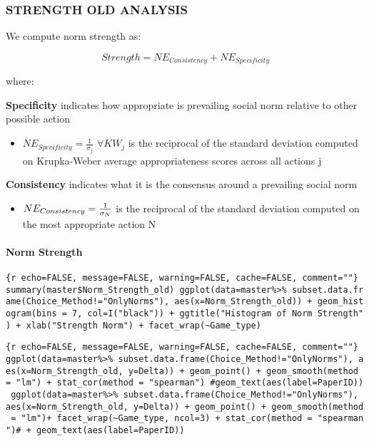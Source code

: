 \hypertarget{strength-old-analysis}{%
\subsubsection{STRENGTH OLD ANALYSIS}\label{strength-old-analysis}}

We compute norm strength as:

\[Strength = {NE_{Consistency}+NE_{Specificity}}\]

where:

\textbf{Specificity} indicates how appropriate is prevailing social norm
relative to other possible action

\begin{itemize}
\tightlist
\item
  \(NE_{Specificity} = \frac{1}{\sigma_j}\) \(\forall KW_j\) is the
  reciprocal of the standard deviation computed on Krupka-Weber average
  appropriateness scores across all actions j
\end{itemize}

\textbf{Consistency} indicates what it is the consensus around a
prevailing social norm

\begin{itemize}
\tightlist
\item
  \(NE_{Consistency} = {1 \over \sigma_{N}}\) is the reciprocal of the
  standard deviation computed on the most appropriate action N
\end{itemize}

\hypertarget{norm-strength}{%
\paragraph{Norm Strength}\label{norm-strength}}

\texttt{\{r\ echo=FALSE,\ message=FALSE,\ warning=FALSE,\ cache=FALSE,\ comment=""\}\ summary(master\$Norm\_Strength\_old)\ ggplot(data=master\%\textgreater{}\%\ subset.data.frame(Choice\_Method!="OnlyNorms"),\ aes(x=Norm\_Strength\_old))\ +\ geom\_histogram(bins\ =\ 7,\ col=I("black"))\ +\ ggtitle("Histogram\ of\ Norm\ Strength")\ +\ xlab("Strength\ Norm")\ +\ facet\_wrap(\textasciitilde{}Game\_type)}

\texttt{\{r\ echo=FALSE,\ message=FALSE,\ warning=FALSE,\ cache=FALSE,\ comment=""\}\ ggplot(data=master\%\textgreater{}\%\ subset.data.frame(Choice\_Method!="OnlyNorms"),\ aes(x=Norm\_Strength\_old,\ y=Delta))\ +\ geom\_point()\ +\ geom\_smooth(method\ =\ "lm")\ +\ stat\_cor(method\ =\ "spearman")\ \#geom\_text(aes(label=PaperID))\ ggplot(data=master\%\textgreater{}\%\ subset.data.frame(Choice\_Method!="OnlyNorms"),\ aes(x=Norm\_Strength\_old,\ y=Delta))\ +\ geom\_point()\ +\ geom\_smooth(method\ =\ "lm")+\ facet\_wrap(\textasciitilde{}Game\_type,\ ncol=3)\ +\ stat\_cor(method\ =\ "spearman")\#\ +\ geom\_text(aes(label=PaperID))}

